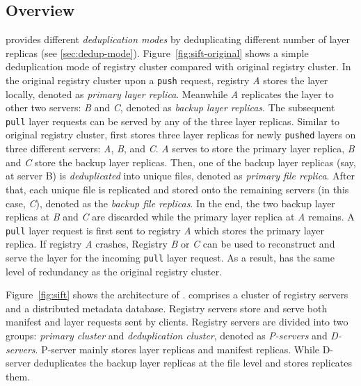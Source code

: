 \subsection{Overview}
\label{sec:overview}


%

\sysname provides different \emph{deduplication modes} by deduplicating different number of layer replicas
(see \ref{sec:dedup-mode}).
Figure~\ref{fig:sift-original} shows a simple deduplication mode of \sysname registry cluster compared with original registry cluster.
In the original registry cluster upon  a \texttt{push} request, 
registry \emph{A} stores the layer locally, denoted as \emph{primary layer replica}.
Meanwhile \emph{A} replicates the layer to other two servers: \emph{B} and \emph{C}, denoted as \emph{backup layer replicas}.
The subsequent \texttt{pull} layer requests can be served by any of the three layer replicas.
Similar to original registry cluster, 
\sysname first stores three layer replicas for newly \texttt{pushed} layers on three different servers: \emph{A}, \emph{B}, and \emph{C}. \emph{A} serves to store the primary layer replica, \emph{B} and \emph{C} store the backup layer replicas.
Then, one of the backup layer replicas (say, at server B) is \emph{deduplicated} into unique files, denoted as \emph{primary file replica}.
After that, each unique file is replicated and stored onto the remaining servers (in this case, \emph{C}), denoted as the \emph{backup file replicas}.
In the end, the two backup layer replicas at \emph{B} and \emph{C} are discarded while the primary layer replica at \emph{A} remains.
A \texttt{pull} layer request is first sent to registry \emph{A} which stores the primary layer replica.
If registry \emph{A} crashes,
Registry \emph{B} or \emph{C} can be used to reconstruct and serve the layer for the incoming \texttt{pull} layer request.
As a result, \sysname has the same level of redundancy as the original registry cluster. 

Figure~\ref{fig:sift} shows the architecture of \sysname.
 \sysname comprises a cluster of registry servers and a distributed metadata database. 
Registry servers store and serve both manifest and layer requests sent by clients.
Registry servers are divided into two groups:
\emph{primary cluster} and \emph{deduplication cluster}, denoted as \emph{P-servers} and \emph{D-servers}.
P-server mainly stores layer replicas and manifest replicas.
While D-server deduplicates the backup layer replicas at the file level and  stores replicates them.

